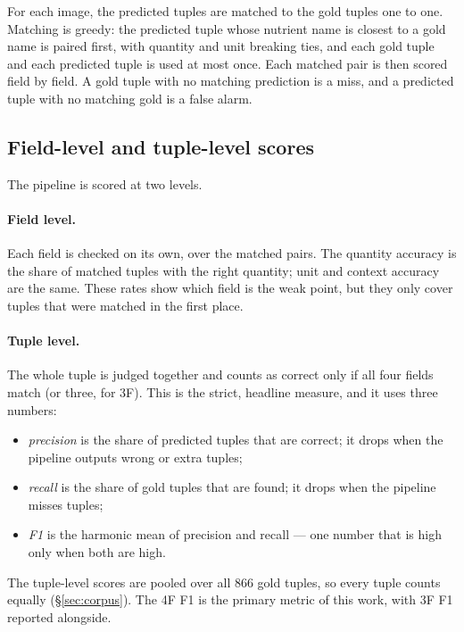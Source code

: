 For each image, the predicted tuples are matched to the gold tuples one to
one. Matching is greedy: the predicted tuple whose nutrient name is closest
to a gold name is paired first, with quantity and unit breaking ties, and
each gold tuple and each predicted tuple is used at most once. Each matched
pair is then scored field by field. A gold tuple with no matching prediction
is a miss, and a predicted tuple with no matching gold is a false alarm.
 
\subsection{Field-level and tuple-level scores}\label{sec:scores}
 
The pipeline is scored at two levels.
 
\paragraph{Field level.} Each field is checked on its own, over the matched
pairs. The quantity accuracy is the share of matched tuples with the right
quantity; unit and context accuracy are the same. These rates show which
field is the weak point, but they only cover tuples that were matched in the
first place.
 
\paragraph{Tuple level.} The whole tuple is judged together and counts as
correct only if all four fields match (or three, for 3F). This is the
strict, headline measure, and it uses three numbers:
\begin{itemize}
  \item \emph{precision} is the share of predicted tuples that are correct;
        it drops when the pipeline outputs wrong or extra tuples;
  \item \emph{recall} is the share of gold tuples that are found; it drops
        when the pipeline misses tuples;
  \item \emph{F1} is the harmonic mean of precision and recall --- one number
        that is high only when both are high.
\end{itemize}
The tuple-level scores are pooled over all $866$ gold tuples, so every tuple
counts equally (\S\ref{sec:corpus}). The 4F F1 is the primary metric of this
work, with 3F F1 reported alongside.
 
\FloatBarrier